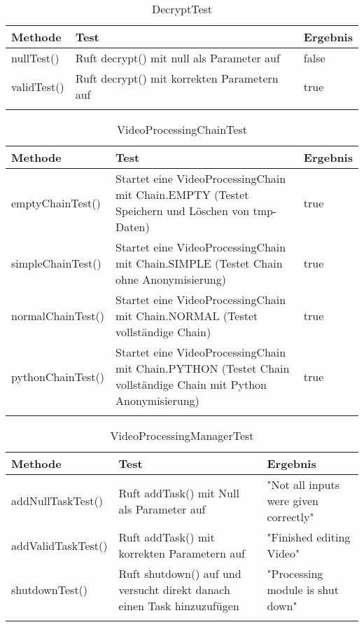  \begin{longtable}{p{} | p{} | p{}}
\hline
   \textbf{Methode} & \textbf{Test} & \textbf{Ergebnis}\\
  \hline
  nullTest() & Ruft decrypt() mit null als Parameter auf & false\\
  \hline
  validTest() & Ruft decrypt() mit korrekten Parametern auf & true\\
  \hline 
  \caption{DecryptTest}
 \end{longtable}
 
 \begin{longtable}{p{} | p{} | p{}}
\hline
  \textbf{Methode} & \textbf{Test} & \textbf{Ergebnis}\\
  \hline
  emptyChainTest() & Startet eine VideoProcessingChain mit Chain.EMPTY (Testet Speichern und Löschen von tmp-Daten) & true\\
  \hline
  simpleChainTest() & Startet eine VideoProcessingChain mit Chain.SIMPLE (Testet Chain ohne Anonymisierung) & true\\
  \hline
  normalChainTest() & Startet eine VideoProcessingChain mit Chain.NORMAL (Testet vollständige Chain) & true\\
  \hline
  pythonChainTest() & Startet eine VideoProcessingChain mit Chain.PYTHON (Testet Chain vollständige Chain mit Python Anonymisierung) & true\\
  \hline
  \caption{VideoProcessingChainTest}
 \end{longtable}
 
 \begin{longtable}{p{} | p{} | p{}}
\hline
  \textbf{Methode} & \textbf{Test} & \textbf{Ergebnis}\\
  \hline
  addNullTaskTest() & Ruft addTask() mit Null als Parameter auf & "Not all inputs were given correctly"\\
  \hline
  addValidTaskTest() & Ruft addTask() mit korrekten Parametern auf & "Finished editing Video"\\
  \hline
  shutdownTest() & Ruft shutdown() auf und versucht direkt danach einen Task hinzuzufügen & "Processing module is shut down"\\
  \hline
  \caption{VideoProcessingManagerTest}
 \end{longtable}